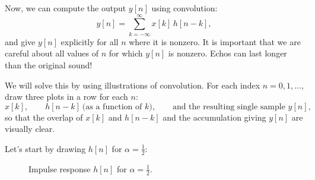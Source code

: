 \documentclass{ee102_notes}
\begin{document}
Now, we can compute the output $y[n]$ using convolution:
\[
y[n]=\sum_{k=-\infty}^{\infty} x[k]\,h[n-k],
\]
and give $y[n]$ explicitly for all $n$ where it is nonzero. It is important that we are careful about all values of $n$ for which $y[n]$ is nonzero. Echos can last longer than the original sound!

We will solve this by using illustrations of convolution. For each index $n=0,1,\dots $, draw three plots in a row for each $n$:
\[
x[k],\qquad h[n-k]\ \text{(as a function of $k$)},\qquad \text{and the resulting single sample }y[n],
\]
so that the overlap of $x[k]$ and $h[n-k]$ and the accumulation giving $y[n]$ are visually clear.

Let's start by drawing $h[n]$ for $\alpha = \tfrac{1}{2}$:

\def\Alpha{0.5}
\def\HLen{6}     %
\def\kmin{-2}    %
\def\kmax{10}

\begin{figure}[h]
    \centering
   
    \label{fig:hn}
    \caption{Impulse response $h[n]$ for $\alpha=\tfrac12$.}
\end{figure}
\end{document}
